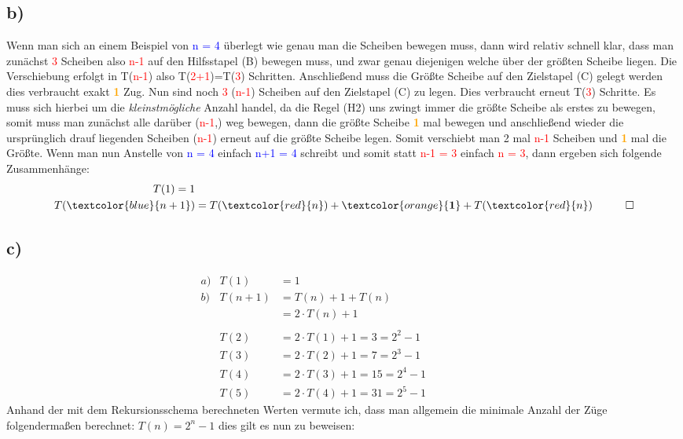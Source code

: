 \documentclass[titlepage]{article}
\begin{document}
			\subsection*{b)}
			Wenn man sich an einem Beispiel von \textcolor{blue}{n = 4} überlegt wie genau man die Scheiben bewegen muss, dann wird relativ schnell klar, dass man zunächst \textcolor{red}{3} Scheiben also \textcolor{red}{n-1} auf den Hilfsstapel (B) bewegen muss, und zwar genau diejenigen welche über der größten Scheibe liegen. Die Verschiebung erfolgt in T(\textcolor{red}{n-1}) also T(\textcolor{red}{2+1})=T(\textcolor{red}{3}) Schritten. Anschließend muss die Größte Scheibe auf den Zielstapel (C) gelegt werden dies verbraucht exakt \textcolor{orange}{\textbf{1}} Zug. Nun sind noch \textcolor{red}{3} (\textcolor{red}{n-1}) Scheiben auf den Zielstapel (C) zu legen. Dies verbraucht erneut T(\textcolor{red}{3}) Schritte. Es muss sich hierbei um die \textit{kleinstmögliche} Anzahl handel, da die Regel (H2) uns zwingt immer die größte Scheibe als erstes zu bewegen, somit muss man zunächst alle darüber (\textcolor{red}{n-1},) weg bewegen, dann die größte Scheibe \textcolor{orange}{\textbf{1}} mal bewegen und anschließend wieder die ursprünglich drauf liegenden Scheiben (\textcolor{red}{n-1}) erneut auf die größte Scheibe legen. Somit verschiebt man 2 mal \textcolor{red}{n-1} Scheiben und \textcolor{orange}{\textbf{1}} mal die Größte. Wenn man nun Anstelle von \textcolor{blue}{n = 4} einfach \textcolor{blue}{n+1 = 4} schreibt und somit statt \textcolor{red}{n-1 = 3} einfach \textcolor{red}{n = 3}, dann ergeben sich folgende Zusammenhänge:
			\begin{align*}
				T(1)=1\\
				T(\textcolor{blue}{n+1})&=T(\textcolor{red}{n})+\textcolor{orange}{\textbf{1}}+T(\textcolor{red}{n}) &\qed
			\end{align*}
			
		\subsection*{c)}
		\begin{align*}
			&a) &T(1)&=1 &&&&&&&&\\
			&b) &T(n+1)&=T(n)+1+T(n)\\
			& & &=2\cdot T(n)+1\\\\
			& &T(2)&=2\cdot T(1)+1=3=2^2-1\\
			& &T(3)&=2\cdot T(2)+1=7=2^3-1\\
			& &T(4)&=2\cdot T(3)+1=15=2^4-1\\
			& &T(5)&=2\cdot T(4)+1=31=2^5-1
		\end{align*}
	Anhand der mit dem Rekursionsschema berechneten Werten vermute ich, dass man allgemein die minimale Anzahl der Züge folgendermaßen berechnet: $T(n)=2^n-1$ dies gilt es nun zu beweisen:
\end{document}
